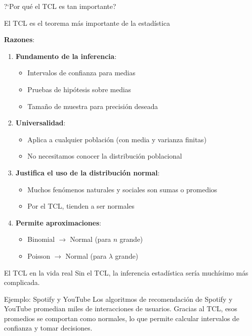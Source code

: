 \documentclass[aspectratio=169, 11pt]{beamer}
\begin{document}
\begin{frame}{?`Por qu\'e el TCL es tan importante?}
\begin{alertblock}{El TCL es el teorema m\'as importante de la estad\'istica}
\end{alertblock}

\textbf{Razones}:
\begin{enumerate}
\item \textbf{Fundamento de la inferencia}:
  \begin{itemize}
  \item Intervalos de confianza para medias
  \item Pruebas de hip\'otesis sobre medias
  \item Tama\~no de muestra para precisi\'on deseada
  \end{itemize}
\item \textbf{Universalidad}:
  \begin{itemize}
  \item Aplica a cualquier poblaci\'on (con media y varianza finitas)
  \item No necesitamos conocer la distribuci\'on poblacional
  \end{itemize}
\item \textbf{Justifica el uso de la distribuci\'on normal}:
  \begin{itemize}
  \item Muchos fen\'omenos naturales y sociales son sumas o promedios
  \item Por el TCL, tienden a ser normales
  \end{itemize}
\item \textbf{Permite aproximaciones}:
  \begin{itemize}
  \item Binomial $\to$ Normal (para $n$ grande)
  \item Poisson $\to$ Normal (para $\lambda$ grande)
  \end{itemize}
\end{enumerate}
\end{frame}

\begin{frame}{El TCL en la vida real}
\alert{Sin el TCL, la inferencia estad\'istica ser\'ia much\'isimo m\'as complicada.}

\begin{exampleblock}{Ejemplo: Spotify y YouTube}
Los algoritmos de recomendaci\'on de Spotify y YouTube promedian miles de interacciones de usuarios. Gracias al TCL, esos promedios se comportan como normales, lo que permite calcular intervalos de confianza y tomar decisiones.
\end{exampleblock}
\end{frame}
\end{document}
